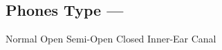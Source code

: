 \subsection[Phones Type]{Phones Type --- \UiKey{\SET}}









































Normal
Open
Semi-Open
Closed
Inner-Ear
Canal
